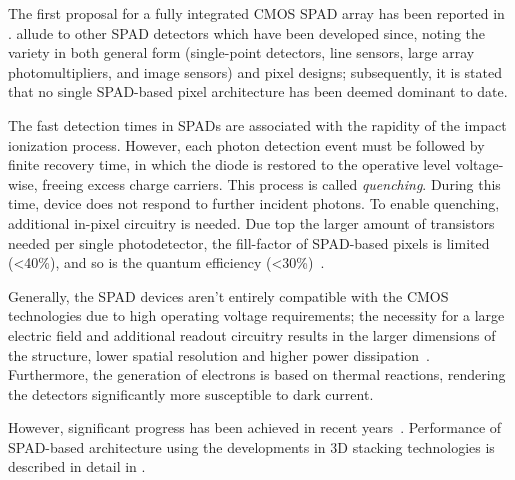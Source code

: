 The first proposal for a fully integrated CMOS SPAD array has been reported in \cite{Rochas2003}. \cite{DuttonSPAD} allude to other SPAD detectors which have been developed since, noting the variety in both general form (single-point detectors, line sensors, large array photomultipliers, and image sensors) and pixel designs; subsequently, it is stated that no single SPAD-based pixel architecture has been deemed dominant to date. 

The fast detection times in SPADs are associated with the rapidity of the impact ionization process. However, each photon detection event must be followed by finite recovery time, in which the diode is restored to the operative level voltage-wise, freeing excess charge carriers. This process is called \textit{quenching}. During this time, device does not respond to further incident photons. To enable quenching, additional in-pixel circuitry is needed.
Due top the larger amount of transistors needed per single photodetector, the fill-factor of SPAD-based pixels is limited (<40\%), and so is the quantum efficiency (<30\%)~\cite{Ma:17}.

Generally, the SPAD devices aren't entirely compatible with the CMOS technologies due to high operating voltage requirements; the necessity for a large electric field and additional readout circuitry results in the larger dimensions of the structure, lower spatial resolution and higher power dissipation~\cite{Ma:17}. Furthermore, the generation of electrons is based on thermal reactions, rendering the detectors significantly more susceptible to dark current.

However, significant progress has been achieved in recent years~\cite{SPADperformance, rng16}. Performance of SPAD-based architecture using the developments in 3D stacking technologies is described in detail in \cite{Charbon2018}.


